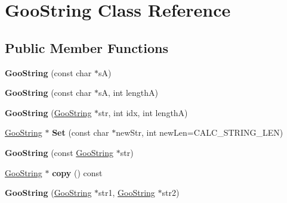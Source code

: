 \hypertarget{class_goo_string}{}\section{Goo\+String Class Reference}
\label{class_goo_string}
\subsection*{Public Member Functions}
\begin{DoxyCompactItemize}
\item 
\mbox{\label{class_goo_string_a60a6c7c98ab55e3d38edd7cb387379c3}} 
{\bfseries Goo\+String} (const char $\ast$sA)
\item 
\mbox{\label{class_goo_string_a1d8efed9f76bd90457b36a5a50d9d432}} 
{\bfseries Goo\+String} (const char $\ast$sA, int lengthA)
\item 
\mbox{\label{class_goo_string_a82628833e9dfc01b58b28b4556e4238d}} 
{\bfseries Goo\+String} (\hyperlink{class_goo_string}{Goo\+String} $\ast$str, int idx, int lengthA)
\item 
\mbox{\label{class_goo_string_ae1f6b79b5cf40fc43fbd2a2584e4bafb}} 
\hyperlink{class_goo_string}{Goo\+String} $\ast$ {\bfseries Set} (const char $\ast$new\+Str, int new\+Len=C\+A\+L\+C\+\_\+\+S\+T\+R\+I\+N\+G\+\_\+\+L\+EN)
\item 
\mbox{\label{class_goo_string_a7b91352109923858de9b9c692e7f7179}} 
{\bfseries Goo\+String} (const \hyperlink{class_goo_string}{Goo\+String} $\ast$str)
\item 
\mbox{\label{class_goo_string_a771180a9dd904dbab17a1cbe12a3418d}} 
\hyperlink{class_goo_string}{Goo\+String} $\ast$ {\bfseries copy} () const
\item 
\mbox{\label{class_goo_string_ad23cba9a89169c12c1f5f5e90507689e}} 
{\bfseries Goo\+String} (\hyperlink{class_goo_string}{Goo\+String} $\ast$str1, \hyperlink{class_goo_string}{Goo\+String} $\ast$str2)
\item 
\mbox{\label{class_goo_string_ac293f865a2632c0273c057777901c568}} 

\end{DoxyCompactItemize}
